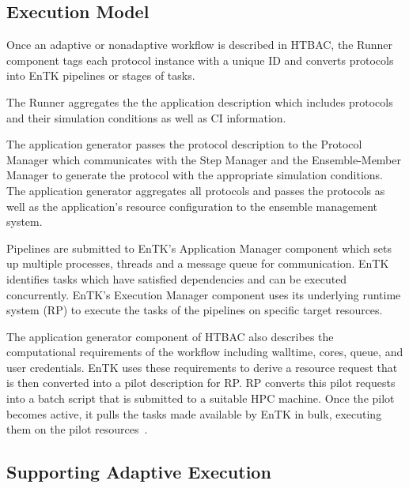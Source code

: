 \subsection{Execution Model}

Once an adaptive or nonadaptive workflow is described in HTBAC, the Runner
component tags each protocol instance with a unique ID and converts protocols
into EnTK pipelines or stages of tasks. 

The Runner aggregates the  
the application description which includes protocols and their simulation 
conditions as well as CI information. 

The application generator passes the protocol description to the 
Protocol Manager which communicates with the Step Manager and the 
Ensemble-Member Manager to generate the protocol with the appropriate 
simulation conditions. The application generator aggregates all protocols 
and passes the protocols as well as the application's resource configuration 
to the ensemble management system.  

Pipelines are submitted to EnTK's
Application Manager component which sets up multiple processes, threads and a
message queue for communication. EnTK identifies tasks which have satisfied
dependencies and can be executed concurrently. EnTK's Execution Manager
component uses its underlying runtime system (RP) to execute the tasks of the
pipelines on specific target resources.


The application generator component of HTBAC also describes the computational 
requirements of the workflow including walltime, cores, queue, and user 
credentials. EnTK uses these requirements to derive a resource request that is 
then converted into a pilot description for RP. RP converts this pilot requests 
into a batch script that is submitted to a suitable HPC machine. Once the pilot 
becomes active, it pulls the tasks made available by EnTK in bulk, executing 
them on the pilot resources~\cite{merzky2015radical}.

\subsection{Supporting Adaptive Execution}

